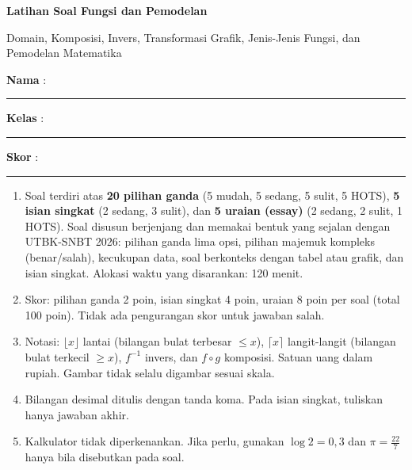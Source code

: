 \documentclass[a4paper,11pt]{article}
\newcounter{no}
\begin{document}
\thispagestyle{fancy}

\begin{center}
  {\color{mainc}\fontsize{22}{26}\selectfont\bfseries Latihan Soal Fungsi dan Pemodelan\par}
  \vspace{2pt}
  {\color{accc}\large Domain, Komposisi, Invers, Transformasi Grafik, Jenis-Jenis Fungsi, dan Pemodelan Matematika\par}
\end{center}
\vspace{2pt}
\begin{tcolorbox}[colback=softbg,colframe=mainc!40,boxrule=0.6pt,arc=3pt,left=8pt,right=8pt,top=5pt,bottom=5pt]
\noindent\textbf{Nama} : \rule{4.6cm}{0.4pt}\hfill\textbf{Kelas} : \rule{2.2cm}{0.4pt}\hfill\textbf{Skor} : \rule{2.2cm}{0.4pt}
\end{tcolorbox}
\vspace{2pt}
\begin{tcolorbox}[colback=white,colframe=accc,boxrule=0.8pt,arc=3pt,left=8pt,right=8pt,top=4pt,bottom=4pt,title={\bfseries Petunjuk Pengerjaan},coltitle=white,fonttitle=\small]
\small
\begin{enumerate}[leftmargin=1.4em,itemsep=1pt,topsep=1pt]
\item Soal terdiri atas \textbf{20 pilihan ganda} (5 mudah, 5 sedang, 5 sulit, 5 HOTS), \textbf{5 isian singkat} (2 sedang, 3 sulit), dan \textbf{5 uraian (essay)} (2 sedang, 2 sulit, 1 HOTS). Soal disusun berjenjang dan memakai bentuk yang sejalan dengan UTBK-SNBT 2026: pilihan ganda lima opsi, pilihan majemuk kompleks (benar/salah), kecukupan data, soal berkonteks dengan tabel atau grafik, dan isian singkat. Alokasi waktu yang disarankan: 120 menit.
\item Skor: pilihan ganda 2 poin, isian singkat 4 poin, uraian 8 poin per soal (total 100 poin). Tidak ada pengurangan skor untuk jawaban salah.
\item Notasi: $\lfloor x\rfloor$ lantai (bilangan bulat terbesar $\le x$), $\lceil x\rceil$ langit-langit (bilangan bulat terkecil $\ge x$), $f^{-1}$ invers, dan $f\circ g$ komposisi. Satuan uang dalam rupiah. Gambar tidak selalu digambar sesuai skala.
\item Bilangan desimal ditulis dengan tanda koma. Pada isian singkat, tuliskan hanya jawaban akhir.
\item Kalkulator tidak diperkenankan. Jika perlu, gunakan $\log 2=0{,}3$ dan $\pi=\frac{22}{7}$ hanya bila disebutkan pada soal.
\end{enumerate}
\end{tcolorbox}
\end{document}
